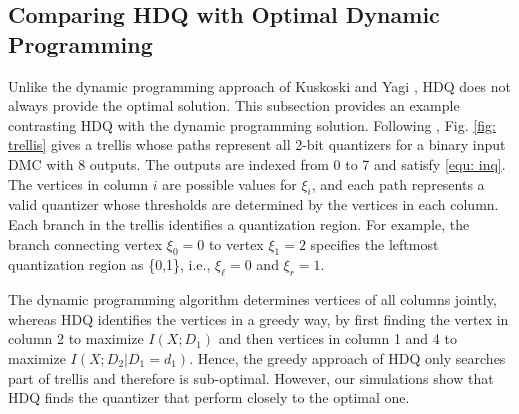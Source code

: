 \documentclass [PhD] {uclathes}
\begin{document}
\subsection{Comparing HDQ with Optimal Dynamic Programming}
Unlike the dynamic programming approach of Kuskoski and Yagi \cite{Kurkoski2014-QuanDMC}, HDQ does not always provide the optimal solution.  
This subsection provides an example contrasting HDQ with the dynamic programming solution. 
Following \cite{Kurkoski2014-QuanDMC}, Fig. \ref{fig: trellis} gives a trellis whose paths represent all 2-bit quantizers for a binary input DMC with 8 outputs. The outputs are indexed from 0 to 7 and satisfy \eqref{equ: inq}. The vertices in column $i$ are possible values for $\xi_i$, and each path represents a valid quantizer whose thresholds are determined by the vertices in each column. Each branch in the trellis identifies a quantization region. For example, the branch connecting vertex $\xi_0=0$ to vertex $\xi_1=2$ specifies the leftmost quantization region as \{0,1\}, i.e., $\xi_{\ell} = 0$ and $\xi_r =1$.



The dynamic programming algorithm determines vertices of all columns jointly, whereas HDQ identifies the vertices in a greedy way, by first finding the vertex in column 2 to maximize $I(X;D_1)$ and then vertices in column 1 and 4 to maximize $I(X;D_2|D_1=d_1)$.  Hence, the greedy approach of HDQ only searches part of trellis and therefore is sub-optimal. However, our simulations show that HDQ finds the quantizer that perform closely to  the optimal one.
\end{document}
